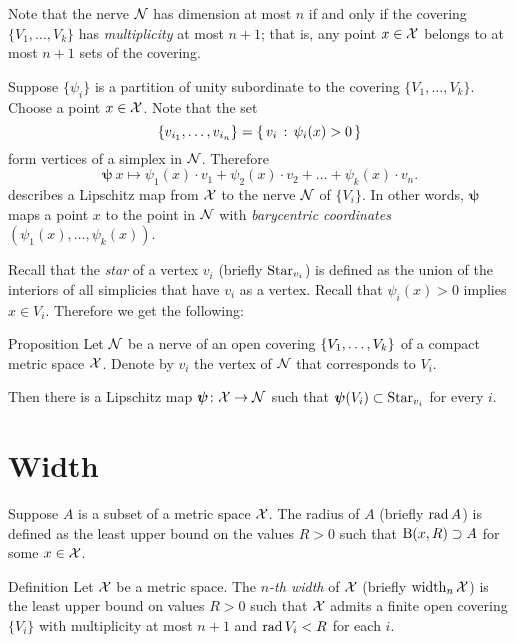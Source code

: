 Note that the nerve $\mathcal{N}$ has dimension at most $n$ if and only if the covering $\{V_1,\dots,V_k\}$ has \emph{multiplicity} at most $n+1$;
that is, any point $x\in\mathcal{X}$ belongs to
at most $n+1$ sets of the covering.

Suppose $\{\psi_i\}$ is  
a partition of unity subordinate to the covering $\{V_1,\dots,V_k\}$.
Choose a point $x\in {\mathcal{X}}$.
Note that the set
$$\{v_{i_1},\dots,v_{i_n}\}=\left\{\,{v_i}\,:\,{\psi_i(x)>0}\,\right\}$$
form vertices of a simplex in $\mathcal{N}$.
Therefore 
$$\bm{\psi}\:x\mapsto \psi_1(x)\cdot v_1+\psi_2(x)\cdot v_2+\dots+\psi_k(x)\cdot v_n.$$
describes a Lipschitz map from ${\mathcal{X}}$ to the nerve $\mathcal{N}$ of $\{V_i\}$.
In other words, $\bm{\psi}$ maps a point $x$ to the point in $\mathcal{N}$ with \emph{barycentric coordinates} $(\psi_1(x),\dots,\psi_k(x))$.

Recall that the \emph{star} of a vertex $v_i$ (briefly $\mathop{\rm Star}\nolimits_{v_i}$) is defined as the union of the interiors of all simplicies that have $v_i$ as a vertex.
Recall that $\psi_i(x)>0$ implies $x\in V_i$.
Therefore we get the following:

\begin{thm}{Proposition}\label{prop:space->nerve}
Let $\mathcal{N}$ be a nerve of an open covering $\{V_1,\z\dots,V_k\}$ of a compact metric space $\mathcal{X}$.
Denote by $v_i$ the vertex of $\mathcal{N}$ that corresponds to $V_i$.

Then there is a Lipschitz map $\bm{\psi}\colon\mathcal{X}\to\mathcal{N}$ such that $\bm{\psi}(V_i)\z\subset\Star_{v_i}$ for every $i$.
\end{thm}


\section{Width}

Suppose $A$ is a subset of a metric space $\mathcal{X}$.
The radius of $A$ (briefly $\mathop{\rm rad}\nolimits A$) is defined as the least upper bound on the values $R>0$ such that $\mathrm{B}{}(x,R)\supset A$ for some $x\in \mathcal{X}$.

\begin{thm}{Definition}\label{def:width}
Let $\mathcal{X}$ be a metric space.
The \emph{$n$-th width} of $\mathcal{X}$ (briefly $\operatorname{\rm width}\nolimits_n\mathcal{X}$) is the least upper bound on values $R>0$ such that $\mathcal{X}$ admits a finite open covering $\{V_i\}$ with multiplicity at most $n+1$ and $\mathop{\rm rad}\nolimits V_i< R$ for each $i$.
\end{thm}

